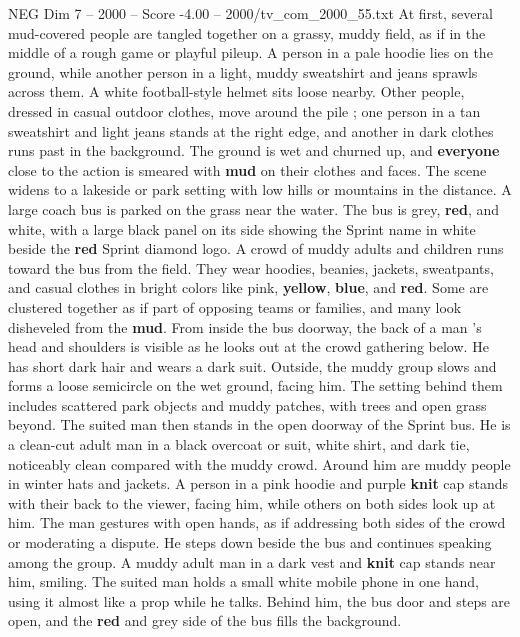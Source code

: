 \begin{textsample}{NEG Dim 7 – 2000 – Score -4.00 – 2000/tv\_com\_2000\_55.txt}  \label{ex:f7_neg_026}
At first, several mud-covered people are tangled together on a grassy, muddy field, as if in the middle of a rough game or playful pileup.
A person in a pale hoodie lies on the ground, while another person in a light, muddy sweatshirt and jeans sprawls across them.
A white football-style helmet sits loose nearby.
Other people, dressed in casual outdoor clothes, move around the pile ; one person in a tan sweatshirt and light jeans stands at the right edge, and another in dark clothes runs past in the background.
The ground is wet and churned up, and \textbf{everyone} close to the action is smeared with \textbf{mud} on their clothes and faces.
The scene widens to a lakeside or park setting with low hills or mountains in the distance.
A large coach bus is parked on the grass near the water.
The bus is grey, \textbf{red}, and white, with a large black panel on its side showing the Sprint name in white beside the \textbf{red} Sprint diamond logo.
A crowd of muddy adults and children runs toward the bus from the field.
They wear hoodies, beanies, jackets, sweatpants, and casual clothes in bright colors like pink, \textbf{yellow}, \textbf{blue}, and \textbf{red}.
Some are clustered together as if part of opposing teams or families, and many look disheveled from the \textbf{mud}.
From inside the bus doorway, the back of a man ’s head and shoulders is visible as he looks out at the crowd gathering below.
He has short dark hair and wears a dark suit.
Outside, the muddy group slows and forms a loose semicircle on the wet ground, facing him.
The setting behind them includes scattered park objects and muddy patches, with trees and open grass beyond.
The suited man then stands in the open doorway of the Sprint bus.
He is a clean-cut adult man in a black overcoat or suit, white shirt, and dark tie, noticeably clean compared with the muddy crowd.
Around him are muddy people in winter hats and jackets.
A person in a pink hoodie and purple \textbf{knit} cap stands with their back to the viewer, facing him, while others on both sides look up at him.
The man gestures with open hands, as if addressing both sides of the crowd or moderating a dispute.
He steps down beside the bus and continues speaking among the group.
A muddy adult man in a dark vest and \textbf{knit} cap stands near him, smiling.
The suited man holds a small white mobile phone in one hand, using it almost like a prop while he talks.
Behind him, the bus door and steps are open, and the \textbf{red} and grey side of the bus fills the background.

\end{textsample}
